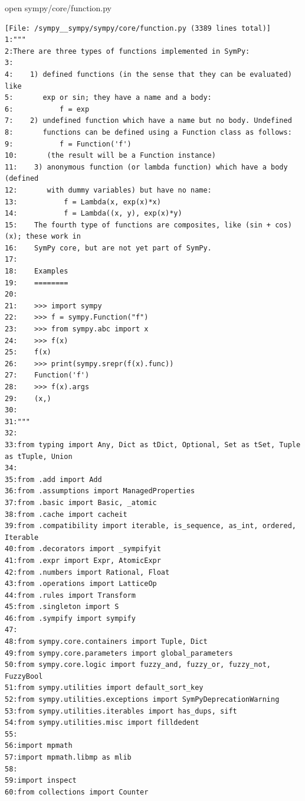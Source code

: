 {\begin{agentbox}
\hrulefill
\begin{CodeVerbatim}[breaklines=true, breakanywhere=true]
open sympy/core/function.py
\end{CodeVerbatim}
\end{agentbox}
\begin{observationbox}\begin{Verbatim}[breaklines=true, breakanywhere=true]
[File: /sympy__sympy/sympy/core/function.py (3389 lines total)]
1:"""
2:There are three types of functions implemented in SymPy:
3:
4:    1) defined functions (in the sense that they can be evaluated) like
5:       exp or sin; they have a name and a body:
6:           f = exp
7:    2) undefined function which have a name but no body. Undefined
8:       functions can be defined using a Function class as follows:
9:           f = Function('f')
10:       (the result will be a Function instance)
11:    3) anonymous function (or lambda function) which have a body (defined
12:       with dummy variables) but have no name:
13:           f = Lambda(x, exp(x)*x)
14:           f = Lambda((x, y), exp(x)*y)
15:    The fourth type of functions are composites, like (sin + cos)(x); these work in
16:    SymPy core, but are not yet part of SymPy.
17:
18:    Examples
19:    ========
20:
21:    >>> import sympy
22:    >>> f = sympy.Function("f")
23:    >>> from sympy.abc import x
24:    >>> f(x)
25:    f(x)
26:    >>> print(sympy.srepr(f(x).func))
27:    Function('f')
28:    >>> f(x).args
29:    (x,)
30:
31:"""
32:
33:from typing import Any, Dict as tDict, Optional, Set as tSet, Tuple as tTuple, Union
34:
35:from .add import Add
36:from .assumptions import ManagedProperties
37:from .basic import Basic, _atomic
38:from .cache import cacheit
39:from .compatibility import iterable, is_sequence, as_int, ordered, Iterable
40:from .decorators import _sympifyit
41:from .expr import Expr, AtomicExpr
42:from .numbers import Rational, Float
43:from .operations import LatticeOp
44:from .rules import Transform
45:from .singleton import S
46:from .sympify import sympify
47:
48:from sympy.core.containers import Tuple, Dict
49:from sympy.core.parameters import global_parameters
50:from sympy.core.logic import fuzzy_and, fuzzy_or, fuzzy_not, FuzzyBool
51:from sympy.utilities import default_sort_key
52:from sympy.utilities.exceptions import SymPyDeprecationWarning
53:from sympy.utilities.iterables import has_dups, sift
54:from sympy.utilities.misc import filldedent
55:
56:import mpmath
57:import mpmath.libmp as mlib
58:
59:import inspect
60:from collections import Counter

\end{Verbatim}
\end{observationbox}}
